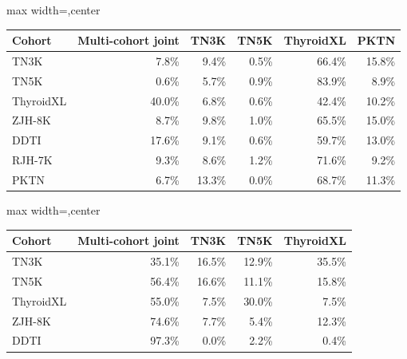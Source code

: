 \begin{responsetable}
\caption{}
\begin{adjustbox}{max width=\textwidth,center}
\begin{tabular}{@{}l r r r r r@{}}
\toprule
Cohort & Multi-cohort joint & TN3K & TN5K & ThyroidXL & PKTN \\
\midrule
TN3K & 7.8\% & 9.4\% & 0.5\% & 66.4\% & 15.8\% \\
TN5K & 0.6\% & 5.7\% & 0.9\% & 83.9\% & 8.9\% \\
ThyroidXL & 40.0\% & 6.8\% & 0.6\% & 42.4\% & 10.2\% \\
ZJH-8K & 8.7\% & 9.8\% & 1.0\% & 65.5\% & 15.0\% \\
DDTI & 17.6\% & 9.1\% & 0.6\% & 59.7\% & 13.0\% \\
RJH-7K & 9.3\% & 8.6\% & 1.2\% & 71.6\% & 9.2\% \\
PKTN & 6.7\% & 13.3\% & 0.0\% & 68.7\% & 11.3\% \\
\bottomrule
\end{tabular}
\end{adjustbox}
\end{responsetable}
\begin{responsetable}
\caption{}
\begin{adjustbox}{max width=\textwidth,center}
\begin{tabular}{@{}l r r r r@{}}
\toprule
Cohort & Multi-cohort joint & TN3K & TN5K & ThyroidXL \\
\midrule
TN3K & 35.1\% & 16.5\% & 12.9\% & 35.5\% \\
TN5K & 56.4\% & 16.6\% & 11.1\% & 15.8\% \\
ThyroidXL & 55.0\% & 7.5\% & 30.0\% & 7.5\% \\
ZJH-8K & 74.6\% & 7.7\% & 5.4\% & 12.3\% \\
DDTI & 97.3\% & 0.0\% & 2.2\% & 0.4\% \\
\bottomrule
\end{tabular}
\end{adjustbox}
\end{responsetable}
